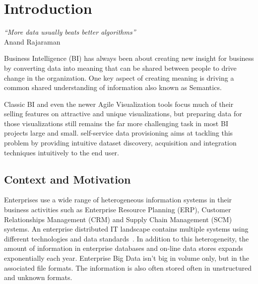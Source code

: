 \chapter{Introduction}  \label{ch:intro}
\graphicspath{{introduction/figures/}}

\begin{flushright}
\textit{``More data usually beats better algorithms''}\\
 Anand Rajaraman

\end{flushright}

Business Intelligence (BI) has always been about creating new insight for business by converting data into meaning that can be shared between people to drive change in the organization. One key aspect of creating meaning is driving a common shared understanding of information also known as Semantics.

Classic BI and even the newer Agile Visualization tools focus much of their selling features on attractive and unique visualizations, but preparing data for those visualizations still remains the far more challenging task in most BI projects large and small. self-service data provisioning aims at tackling this problem by providing intuitive dataset discovery, acquisition and integration techniques intuitively to the end user.

\section{Context and Motivation} \label{sec:motivation}

Enterprises use a wide range of heterogeneous information systems in their business activities such as Enterprise Resource Planning (ERP), Customer Relationships Management (CRM) and Supply Chain Management (SCM) systems. An enterprise distributed IT landscape contains multiple systems using different technologies and data standards~\cite{Mihindukulasooriya:COLD:13}. In addition to this heterogeneity, the amount of information in enterprise databases and on-line data stores expands exponentially each year. Enterprise Big Data isn't big in volume only, but in the associated file formats. The information is also often stored often in unstructured and unknown formats.

